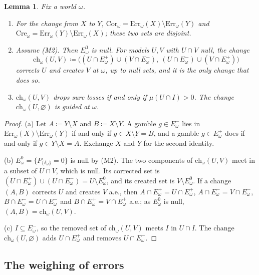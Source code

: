 \documentclass[11pt]{article}
\newtheorem{lemma}[theorem]{Lemma}
\theoremstyle{definition}
\newcommand{\Err}{\mathrm{Err}}
\newcommand{\Cor}{\mathrm{Cor}}
\newcommand{\Cre}{\mathrm{Cre}}
\newcommand{\ch}{\mathrm{ch}}
\newcommand{\Ep}{E^{+}}
\newcommand{\Em}{E^{-}}
\newcommand{\Ez}{E^{0}}
\begin{document}
\begin{lemma}\label{lem:errors}
Fix a world $\omega$.
\begin{enumerate}[label=(\alph*)]
\item For the change from $X$ to $Y$, $\Cor_\omega=\Err_\omega(X)\setminus\Err_\omega(Y)$ and $\Cre_\omega=\Err_\omega(Y)\setminus\Err_\omega(X)$; these two sets are disjoint.
\item Assume (M2). Then $\Ez_\omega$ is null. For models $U,V$ with $U\cap V$ null, the change
\[
\ch_\omega(U,V)\coloneqq\bigl((U\cap\Ep_\omega)\cup(V\cap\Em_\omega),\ (U\cap\Em_\omega)\cup(V\cap\Ep_\omega)\bigr)
\]
corrects $U$ and creates $V$ at $\omega$, up to null sets, and it is the only change that does so.
\item $\ch_\omega(U,V)$ drops sure losses if and only if $\mu(U\cap I)>0$. The change $\ch_\omega(U,\varnothing)$ is guided at $\omega$.
\end{enumerate}
\end{lemma}
\begin{proof}
(a) Let $A\coloneqq Y\setminus X$ and $B\coloneqq X\setminus Y$. A gamble $g\in\Em_\omega$ lies in $\Err_\omega(X)\setminus\Err_\omega(Y)$ if and only if $g\in X\setminus Y=B$, and a gamble $g\in\Ep_\omega$ does if and only if $g\in Y\setminus X=A$. Exchange $X$ and $Y$ for the second identity.

(b) $\Ez_\omega=\{P_{\{\delta_\omega\}}=0\}$ is null by (M2). The two components of $\ch_\omega(U,V)$ meet in a subset of $U\cap V$, which is null. Its corrected set is $(U\cap\Ep_\omega)\cup(U\cap\Em_\omega)=U\setminus\Ez_\omega$, and its created set is $V\setminus\Ez_\omega$. If a change $(A,B)$ corrects $U$ and creates $V$ a.e., then $A\cap\Ep_\omega=U\cap\Ep_\omega$, $A\cap\Em_\omega=V\cap\Em_\omega$, $B\cap\Em_\omega=U\cap\Em_\omega$ and $B\cap\Ep_\omega=V\cap\Ep_\omega$ a.e.; as $\Ez_\omega$ is null, $(A,B)=\ch_\omega(U,V)$.

(c) $I\subseteq\Em_\omega$, so the removed set of $\ch_\omega(U,V)$ meets $I$ in $U\cap I$. The change $\ch_\omega(U,\varnothing)$ adds $U\cap\Ep_\omega$ and removes $U\cap\Em_\omega$.
\end{proof}

\subsection{The weighing of errors}
\end{document}
